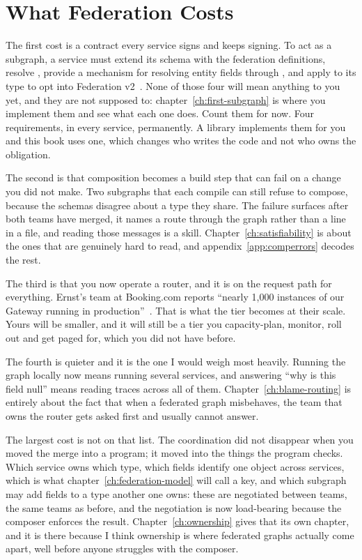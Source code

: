 \section{What Federation Costs}
\label{sec:ch01-what-federation-costs}

%
The first cost is a contract every service signs and keeps signing. To act as a
subgraph, a service must extend its schema with the federation definitions,
resolve , provide a mechanism for resolving entity fields
through , and apply  to its 
type to opt into Federation v2~\autocite{apollosubgraphspec}. None of those
four will mean anything to you yet, and they are not supposed to:
chapter~\ref{ch:first-subgraph} is where you implement them and see what each
one does. Count them for now. Four requirements, in every service,
permanently. A library implements them for you and this book uses one, which
changes who writes the code and not who owns the obligation.

The second is that composition becomes a build step that can fail on a change
you did not make. Two subgraphs that each compile can still refuse to compose,
because the schemas disagree about a type they share. The failure surfaces
after both teams have merged, it names a route through the graph rather than a
line in a file, and reading those messages is a skill.
Chapter~\ref{ch:satisfiability} is about the ones that are genuinely hard to
read, and appendix~\ref{app:comperrors} decodes the rest.

The third is that you now operate a router, and it is on the request path for
everything. Ernst's team at Booking.com reports \enquote{nearly 1,000 instances
of our Gateway running in production}~\autocite{ernst2022}. That is what the
tier becomes at their scale. Yours will be smaller, and it will still be a tier
you capacity-plan, monitor, roll out and get paged for, which you did not have
before.

The fourth is quieter and it is the one I would weigh most heavily. Running the
graph locally now means running several services, and answering \enquote{why is
this field null} means reading traces across all of them.
Chapter~\ref{ch:blame-routing} is entirely about the fact that when a federated
graph misbehaves, the team that owns the router gets asked first and usually
cannot answer.

The largest cost is not on that list. The coordination did not disappear when
you moved the merge into a program; it moved into the things the program
checks. Which service owns which type, which fields identify one object across
services, which is what chapter~\ref{ch:federation-model} will call a key, and
which subgraph may add fields to a type another one owns: these are negotiated
between teams, the same teams as before, and the negotiation is now
load-bearing because the composer enforces the result.
Chapter~\ref{ch:ownership} gives that its own chapter, and it is there because
I think ownership is where federated graphs actually come apart, well before
anyone struggles with the composer.
